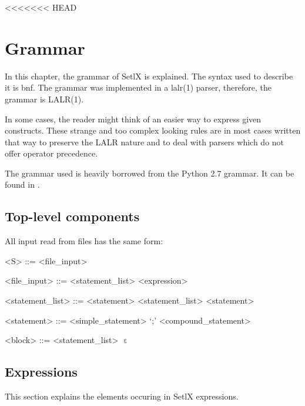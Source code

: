 <<<<<<< HEAD
\section{Grammar}

In this chapter, the grammar of SetlX is explained. The syntax used to describe it is \gls{bnf}. The grammar was implemented in a \gls{lalr}(1) parser, therefore, the grammar is LALR(1). 

In some cases, the reader might think of an easier way to express given constructs. These strange and too complex looking rules are in most cases written that way to preserve the LALR nature and to deal with parsers which do not offer operator precedence.

The grammar used is heavily borrowed from the Python 2.7 grammar. It can be found in \cite{py2}.

%
%
\subsection{Top-level components}

All input read from files has the same form:

\begin{grammar}
<S> ::= <file_input>

<file_input> ::= <statement_list>
\alt <expression>

<statement_list> ::= <statement>
\alt <statement_list> <statement>

<statement> ::= <simple_statement> `;'
\alt <compound_statement>

<block> ::= <statement_list>
\alt $\upepsilon$
\end{grammar}

%
%
\clearpage
\subsection{Expressions}

This section explains the elements occuring in SetlX expressions.

